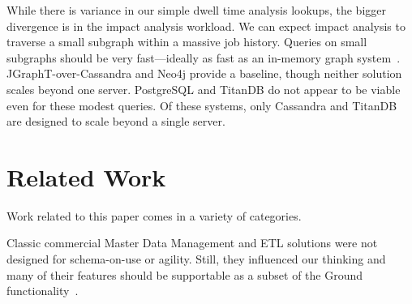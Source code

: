 \documentclass{sig-alternate}
\begin{document}
\smallitembot
While there is variance in our simple dwell time analysis lookups, the bigger divergence is in the impact analysis workload.
We can expect impact analysis to traverse a small subgraph within a massive job history. Queries on small subgraphs should be very fast---ideally as fast as an in-memory graph system~\cite{mcsherry2015scalability}. JGraphT-over-Cassandra and Neo4j provide a baseline, though neither solution scales beyond one server. PostgreSQL and TitanDB do not appear to be viable even for these modest queries. Of these systems, only Cassandra and TitanDB are designed to scale beyond a single server.





\section{Related Work}
\label{sec:relwork}
Work related to this paper comes in a variety of categories. 


Classic commercial Master Data Management and ETL solutions were not designed for 
schema-on-use or agility. 
Still, they influenced our thinking and many of their features should be supportable as a subset of the Ground functionality~\cite{loshin2010master}.
\end{document}
